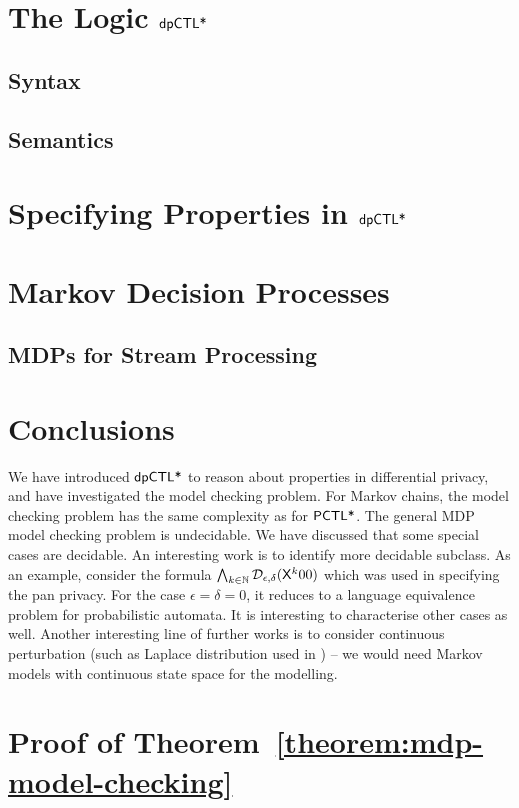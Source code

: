 \documentclass{llncs}
\begin{document}
\section{The Logic $\textsf{dpCTL*}$}
\label{section:dpCTL}


\subsection{Syntax}
\label{subsection:syntax}


\subsection{Semantics}
\label{subsection:semantics}


\section{Specifying Properties in $\textsf{dpCTL*}$}
\label{section:specifying-properties}


\section{Markov Decision Processes}
\label{section:mdp}


%


\subsection{MDPs for Stream Processing}
\label{section:applications}


\section{Conclusions}
\label{section:conclusions}
We have introduced $\textsf{dpCTL*}$ to reason about properties in differential privacy, and have investigated the model checking problem. For Markov chains, the model checking problem has the same complexity as for $\textsf{PCTL*}$. The general MDP model checking problem is undecidable. We have discussed that some special cases are decidable. An interesting work is to identify more
decidable subclass. As an example, consider the formula $\bigwedge_{k \in \mathbb{N}}
\mathcal{D}_{{\epsilon}, {\delta}} (\mathsf{X}^k  00)$ which was used in specifying the pan privacy. For the case $\epsilon=\delta=0$, it reduces to a language equivalence problem for probabilistic automata. It is interesting to characterise other cases as well.
 Another interesting line of further works is to consider continuous perturbation (such as Laplace distribution used in \cite{DR:14:AFDP}) -- we would need Markov models with continuous state space for the modelling.





\newpage
\appendix

\section{Proof of Theorem~\ref{theorem:mdp-model-checking}}

\end{document}
